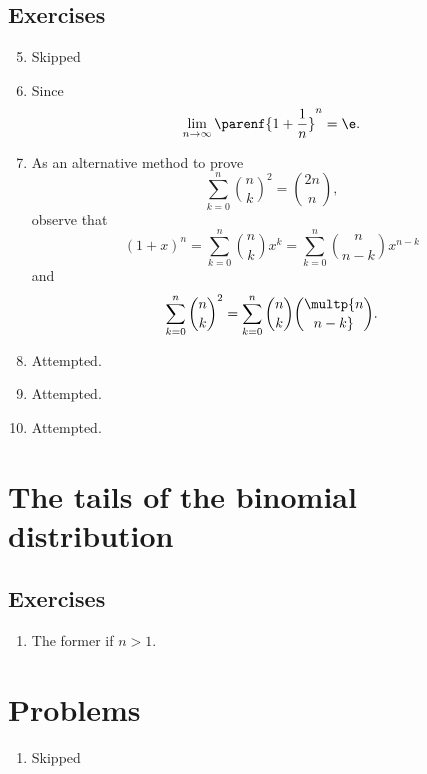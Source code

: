 \subsection*{Exercises}
\begin{enumerate}[\thesection-1]
%
\setcounter{enumi}{4}
%
\item Skipped
%
\item Since
\[
\lim_{n \to \infty} \parenf{1 + \frac{1}{n}}^n = \e.
\]
%
\item As an alternative method to prove
\[
\sum^n_{k = 0} {n \choose k}^2 = {2n \choose n},
\]
observe that
\[
(1 + x)^n = \sum^n_{k = 0} {n \choose k} x^k = \sum^n_{k = 0} {n \choose n - k} x^{n - k}
\]
and
\[
\sum^n_{k = 0} {n \choose k}^2 = \sum^n_{k = 0} {n \choose k} \multp {n \choose n - k}.
\]
%
\item Attempted.
%
\item Attempted.
%
\item Attempted.
%
\end{enumerate}

\section{The tails of the binomial distribution}
\subsection*{Exercises}
\begin{enumerate}[\thesection-1]
%
\item The former if $n > 1$.
%
\end{enumerate}

\section*{Problems}
\begin{enumerate}[\thechapter-1]
%
\item Skipped
%
\end{enumerate}